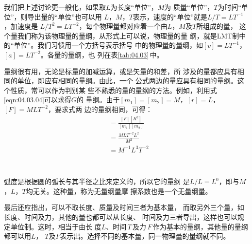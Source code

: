 我们把上述讨论更一般化，如果取$ L $为长度“单位”，$ M $为
质量“单位”，$ T $为时间“单位”，则导出量的“单位”也可以用
$ L $，$ M $，$ T $表示，速度的“单位”就是$ L / T = L T ^ { - 1 } $ ，加速度是
$ L / T ^ { 2 } = L T ^ { - 2 } $，每个物理量都对应着一个由$ L $，$ M $及$ T $所组成的量，
这个量我们称为该物理量的量纲，从形式上可以说，物理量的量
纲，就是LMT制中的“单位”。我们习惯用一个方括号表示括号
中的物理量的量纲，如$ [ v ] = L T ^ { - 1 } $， $ [ a ] = L T ^ { - 2 }$。各量的量纲，也
列在表\ref{tab:04.03}\,中。

量纲很有用，无论是标量的加减运算，或是矢量的和差，所
涉及的量都应具有相同的单位，即应有相同的量纲。由此，一个
公式两边的量应具有相同的量纲。这个性质，常可以作为判别某
些不熟悉的量的量纲的方法。例如，利用式\eqref{eqn:04.03.04}可以求得$ G $的
量纲。由于$ [ m _ { 1 } ] = [ m _ { 2 } ] = M $，$ [ r ] = L $， $ [  F ] = M L T ^ { - 2 } $，要求式两
边的量纲相同，可得：
\begin{align*}
[ G ] &= \frac { [ F ] [ R ^ 2] } { [ m _ { 1 } ] [ m _ { 2 } ] } \\
&= \frac { M L T ^ { - 2 } L ^ { 2 } } { M ^ { 2 } } \\
&= M ^ { - 1 } L ^ { 3 } T ^ { - 2 }
\end{align*}

~ \vspace{-2em}

弧度是根据圆的弧长与其半径之比来定义的，所以它的量纲
是$ L / L = L ^ { 0 } $，即与$ M $，$ L $，$ T $均无关。这种量，称为无量纲量摩
擦系数也是一个无量纲量。

最后还应指出，可以不取长度、质量及时间三者为基本量，
而取另外三个量，如长度、时间及力，其他的量也都可以从长度、
时间及力三者导出，这样也可以规定单位制。这时，相当于由长
度$ L $、\!时间\,$ T $\,及力\,$ F $\,作为基本的量纲，其他量的量纲都可以用$ L $，
$ T $及$ F $表示出。选择不同的基本量，同一物理量的量纲就不同。
